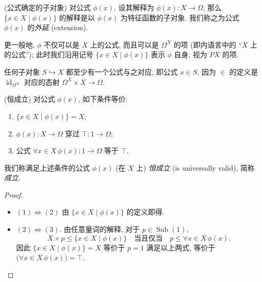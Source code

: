 \begin{example}
	[label={subobject-from-formula}]
	{(公式确定的子对象)}
	对公式 $\phi(x)$, 设其解释为 $\phi(x)\colon X\to\Omega$, 那么 $\{x\in X \mid \phi(x)\}$ 的解释是以 $\phi(x)$ 为特征函数的子对象.
	我们称之为公式 $\phi(x)$ 的\emph{外延} (extension)\footnotemark{}.
	
	更一般地, $\phi$ 不仅可以是 $X$ 上的公式, 而且可以是 $\Omega^X$ 的项 (即内语言中的 ``$X$ 上的公式''); 此时我们沿用记号 $\{x\in X\mid\phi(x)\}$ 表示 $\phi$ 自身, 视为 $PX$ 的项.
	
	任何子对象 $S\hookrightarrow X$ 都至少有一个公式与之对应, 即公式 $x\in S$, 因为 $\in$ 的定义是 $\operatorname{id}_{\Omega^X}$ 对应的态射 $\Omega^X\times X \to \Omega$.
\end{example}


\begin{propdef}
	[label={universally-valid}]
	{(恒成立)}
	对公式 $\phi(x)$, 如下条件等价:
	\begin{enumerate}[(1)]
		\item $\{x\in X\mid \phi(x)\} = X$;
		\item $\phi(x)\colon X\to\Omega$ 穿过 $\top\colon 1\to\Omega$;
		\item 公式 $\forall x\in X\, \phi(x) \colon 1 \to \Omega$ 等于 $\top$.
	\end{enumerate}
	我们称满足上述条件的公式 $\phi(x)$ (在 $X$ 上) \emph{恒成立} (is universally valid), 简称\emph{成立}.
\end{propdef}
\begin{proof}~
	\begin{itemize}
		\item $(1)\Leftrightarrow (2)$ 由 $\{x\in X\mid \phi(x)\}$ 的定义即得.
		\item $(2)\Leftrightarrow (3)$. 由任意量词的解释, 对于 $p\in\operatorname{Sub}(1)$,
		\[
		X\times p\leq \{x\in X\mid \phi(x)\}\quad \text{当且仅当}\quad p\leq \forall x\in X\, \phi(x).
		\]
		因此 $\{x\in X\mid \phi(x)\} = X$ 等价于 $p=1$ 满足以上两式, 等价于 $\big(\forall x\in X\, \phi(x)\big) = \top$.
	\end{itemize}
\end{proof}

